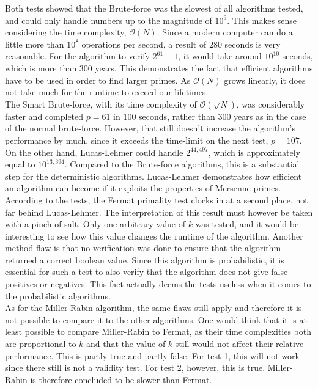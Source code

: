 \documentclass[main.tex]{subfiles}
\begin{document}
Both tests showed that the Brute-force was the slowest of all algorithms
tested, and could only handle numbers up to the magnitude of $10^{9}$. This
makes sense considering the time complexity, $\mathcal{O}(N)$. Since a modern
computer can do a little more than $10^{8}$ operations per second, a result of
$280$ seconds is very reasonable. For the algorithm to verify $2^{61}-1$, it would take
around $10^{10}$ seconds, which is more than $300$ years. This demonstrates the
fact that efficient algorithms have to be used in order to find larger primes. As $\mathcal{O}(N)$ grows
linearly, it does not take much for the runtime to exceed our lifetimes. \\

The Smart Brute-force, with its time complexity of $\mathcal{O}(\sqrt{N})$, was
considerably faster and completed $p=61$ in $100$ seconds, rather than $300$
years as in the case of the normal brute-force. However, that still doesn't
increase the algorithm's performance by much, since it exceeds the time-limit on
the next test, $p=107$. \\

On the other hand, Lucas-Lehmer could handle $2^{44,497}$, which is approximately
equal to $10^{13,394}$. Compared to the Brute-force algorithms, this is a
substantial step for the deterministic algorithms. Lucas-Lehmer demonstrates
how efficient an algorithm can become if it exploits the properties of Mersenne primes. \\

According to the tests, the Fermat primality test clocks in at a second place,
not far behind Lucas-Lehmer. The interpretation of this result must however be
taken with a pinch of salt. Only one arbitrary value of $k$ was tested, and it
would be interesting to see how this value changes the runtime of the algorithm.
Another method flaw is that no verification was done to ensure that the
algorithm returned a correct boolean value. Since this algorithm is
probabilistic, it is essential for such a test to also verify that the algorithm
does not give false positives or negatives. This fact actually deems the tests
useless when it comes to the probabilistic algorithms.\\

As for the Miller-Rabin algorithm, the same flaws still apply and therefore it
is not possible to compare it to the other algorithms. One would think that it
is at least possible to compare Miller-Rabin to Fermat, as their time
complexities both are proportional to $k$ and that the value of $k$ still would
not affect their relative performance. This is partly true and partly false. For
test 1, this will not work since there still is not a validity test. For test 2,
however, this is true. Miller-Rabin is therefore concluded to be slower than Fermat.
\end{document}
